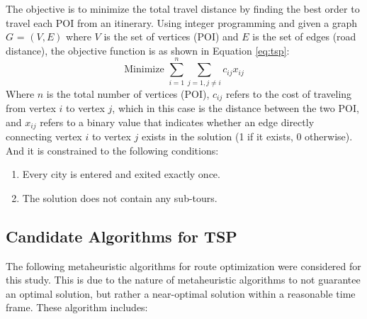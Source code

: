 The objective is to minimize the total travel distance by finding the best order to travel each POI from an itinerary. Using integer programming and given a graph $G$ = $(V, E)$ where \( V \) is the set of vertices (POI) and \( E \) is the set of edges (road distance), the objective function is as shown in Equation \ref{eq:tsp}:
\begin{equation}
	\label{eq:tsp}
	\text{Minimize } \sum_{i = 1}^{n} \sum_{j = 1, j \neq i} c_{ij} x_{ij}
\end{equation}
Where $n$ is the total number of vertices (POI), $c_{ij}$ refers to the cost of traveling from vertex $i$ to vertex $j$, which in this case is the distance between the two POI, and $x_{ij}$ refers to a binary value that indicates whether an edge directly connecting vertex $i$ to vertex $j$ exists in the solution (1 if it exists, 0 otherwise). And it is constrained to the following conditions:
\begin{enumerate}
	\item Every city is entered and exited exactly once.
	\item The solution does not contain any sub-tours.
\end{enumerate}

\subsection{Candidate Algorithms for TSP}
The following metaheuristic algorithms for route optimization were considered for this study. This is due to the nature of metaheuristic algorithms to not guarantee an optimal solution, but rather a near-optimal solution within a reasonable time frame. These algorithm includes:

